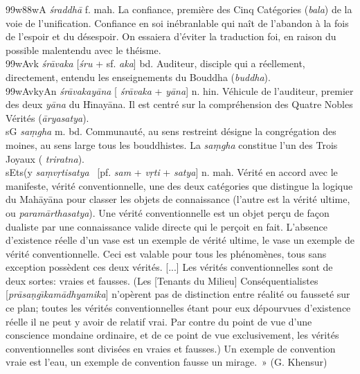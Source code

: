 \documentclass[a4paper,11pt,twocolumn]{article}
\begin{document}

{\dn \399w\388wA} {\em \'{s}raddh\={a}} f. mah. \og La confiance\fg,
première des Cinq Catégories ({\em bala}) de la voie de
l'unification. Confiance en soi inébranlable qui naît de l'abandon à
la fois de l'espoir et du désespoir. On essaiera d'éviter la
traduction \og foi\fg, en raison du possible malentendu avec le
théisme. \\

{\dn \399wAvk} {\em \'{s}r\={a}vaka} [{\em \'{s}ru} + sf. {\em aka}]
bd. \og Auditeur\fg, disciple qui a réellement, directement, entendu les
enseignements du Bouddha ({\em buddha}). \\

{\dn \399wAvkyAn} {\em \'{s}r\={a}vakay\={a}na} [{\em
\'{s}r\={a}vaka} + {\em y\={a}na}] n. hin. \og Véhicule de l'auditeur\fg,
premier des deux {\em y\={a}na} du  H\={\i}nay\={a}na. Il est centré
sur la compréhension des Quatre Nobles Vérités  ({\em \={a}ryasatya}). \\

{\dn s\2G} {\em sa\d{m}gha} m. bd. \og Communauté\fg, au sens
restreint désigne la congrégation des moines, au sens large tous les
bouddhistes. La {\em sa\d{m}gha} constitue l'un des Trois Joyaux ({\em
triratna}). \\

{\dn s\2Ets(y} {\em sa\d{m}v\d{r}tisatya} \ [pf. {\em sam} +
{\em v\d{r}ti} + {\em satya}] n. mah. \og Vérité en accord avec le
manifeste\fg, vérité conventionnelle, une des deux catégories que
distingue la logique du Mah\={a}y\={a}na pour classer les
objets de connaissance (l'autre est la vérité ultime, ou {\em
param\={a}rthasatya}). \og Une vérité conventionnelle est un objet
per\c{c}u de fa\c{c}on dualiste par une connaissance valide directe
qui le per\c{c}oit en fait. L'absence d'existence réelle d'un vase est
un exemple de vérité ultime, le vase un exemple de vérité
conventionnelle. Ceci est valable pour tous les phénomènes, tous sans
exception possèdent ces deux vérités. [...] Les vérités
conventionnelles sont de deux sortes: vraies et fausses. (Les [Tenants
du Milieu] Conséquentialistes [{\em pr\={a}sa\d{n}g\={\i}kam\={a}\-dhyamika}]
n'opèrent pas de distinction entre réalité ou fausseté sur ce plan;
toutes les vérités conventionnelles étant pour eux dépourvues
d'existence réelle il ne peut y avoir de relatif vrai. Par contre du
point de vue d'une conscience mondaine ordinaire, et de ce point de
vue exclusivement, les vérités conventionnelles sont divisées en
vraies et fausses.) Un exemple de convention vraie est l'eau, un
exemple de convention fausse un mirage.~» (G. Khensur) \\
\end{document}
